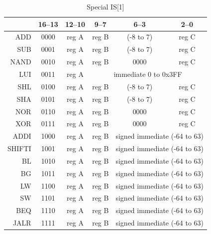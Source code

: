 \documentclass[10pt,a4paper]{article}
\theoremstyle{definition}%
\begin{document}
\begin{table}[ht!]
	\begin{center}
		\begin{tabular}{r|c|c|c|c|c}%
		\toprule
		\diaghead{bourage~}{Instr}{ bit}	& 16--13  & 12--10  & {9--7}  & 6--3  & {2--0}\\
		\midrule
		ADD & 0000 & reg A & reg B & (-8 to 7) & {reg C} \\
		SUB & 0001 & reg A & reg B & (-8 to 7) & {reg C} \\
		NAND & 0010 & reg A & reg B & 0000 & {reg C} \\ \cmidrule{4-6} %
		LUI & 0011 & reg A & \multicolumn{3}{c}{immediate 0 to 0x3FF} \\ %
		\cmidrule{4-6}
		SHL & 0100 & reg A & reg B & (-8 to 7) & {reg C} \\
		SHA & 0101 & reg A & reg B & (-8 to 7) & {reg C} \\
		NOR & 0110 & reg A & reg B & 0000 & {reg C} \\
		XOR & 0111 & reg A & reg B & 0000 & {reg C} \\
		\cmidrule{5-6}
		ADDI & 1000 & reg A & reg B & \multicolumn{2}{c}{signed immediate (-64 to 63)} \\
		SHIFTI & 1001 & reg A & reg B & \multicolumn{2}{c}{signed immediate (-64 to 63)} \\
		BL & 1010 & reg A & reg B & \multicolumn{2}{c}{signed immediate (-64 to 63)} \\
		BG & 1011 & reg A & reg B & \multicolumn{2}{c}{signed immediate (-64 to 63)} \\
		LW& 1100 & reg A & reg B & \multicolumn{2}{c}{signed immediate (-64 to 63)} \\
		SW& 1101 & reg A & reg B & \multicolumn{2}{c}{signed immediate (-64 to 63)} \\
		BEQ & 1110 & reg A & reg B & \multicolumn{2}{c}{signed immediate (-64 to 63)} \\
		JALR & 1111 & reg A & reg B & \multicolumn{2}{c}{signed immediate (-64 to 63)} \\
		\bottomrule
		\end{tabular}
	\end{center}
\caption{Special IS[1]}
\label{tab:IS1}
\end{table}

\end{document}

